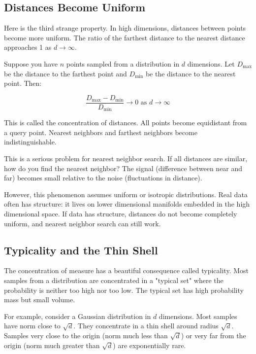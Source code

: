 \vspace{1.5em}

\subsection{Distances Become Uniform}

Here is the third strange property. In high dimensions, distances between points become more uniform. The ratio of the farthest distance to the nearest distance approaches 1 as $d \to \infty$.

Suppose you have $n$ points sampled from a distribution in $d$ dimensions. Let $D_{\max}$ be the distance to the farthest point and $D_{\min}$ be the distance to the nearest point. Then:

\begin{equation}
\frac{D_{\max} - D_{\min}}{D_{\min}} \to 0 \text{ as } d \to \infty
\end{equation}

This is called the concentration of distances. All points become equidistant from a query point. Nearest neighbors and farthest neighbors become indistinguishable.

\vspace{1em}

This is a serious problem for nearest neighbor search. If all distances are similar, how do you find the nearest neighbor? The signal (difference between near and far) becomes small relative to the noise (fluctuations in distance).

However, this phenomenon assumes uniform or isotropic distributions. Real data often has structure: it lives on lower dimensional manifolds embedded in the high dimensional space. If data has structure, distances do not become completely uniform, and nearest neighbor search can still work.

\vspace{1.5em}

\subsection{Typicality and the Thin Shell}

The concentration of measure has a beautiful consequence called typicality. Most samples from a distribution are concentrated in a "typical set" where the probability is neither too high nor too low. The typical set has high probability mass but small volume.

For example, consider a Gaussian distribution in $d$ dimensions. Most samples have norm close to $\sqrt{d}$. They concentrate in a thin shell around radius $\sqrt{d}$. Samples very close to the origin (norm much less than $\sqrt{d}$) or very far from the origin (norm much greater than $\sqrt{d}$) are exponentially rare.

